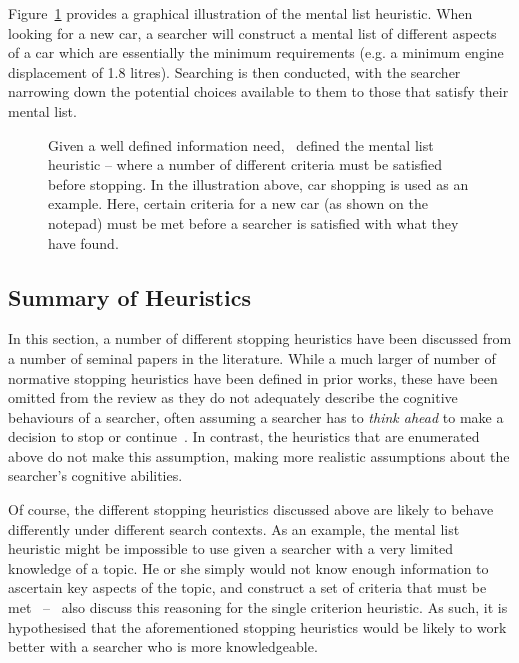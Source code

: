 Figure~\ref{fig:mental_list} provides a graphical illustration of the mental list heuristic. When looking for a new car, a searcher will construct a mental list of different aspects of a car which are essentially the minimum requirements (e.g. a minimum engine displacement of 1.8 litres). Searching is then conducted, with the searcher narrowing down the potential choices available to them to those that satisfy their mental list.

\begin{figure}[t!]
    \centering
    \caption[The mental list stopping heuristic]{Given a well defined information need,~\cite{nickles1995judgment} defined the mental list heuristic – where a number of different criteria must be satisfied before stopping. In the illustration above, car shopping is used as an example. Here, certain criteria for a new car (as shown on the notepad) must be met before a searcher is satisfied with what they have found.}
    \label{fig:mental_list}
\end{figure}

\subsection{Summary of Heuristics}
In this section, a number of different stopping heuristics have been discussed from a number of seminal papers in the literature. While a much larger of number of normative stopping heuristics have been defined in prior works, these have been omitted from the review as they do not adequately describe the cognitive behaviours of a searcher, often assuming a searcher has to \emph{think ahead} to make a decision to stop or continue~\citep{browne2004stopping_rules}. In contrast, the heuristics that are enumerated above do not make this assumption, making more realistic assumptions about the searcher's cognitive abilities.

Of course, the different stopping heuristics discussed above are likely to behave differently under different search contexts. As an example, the mental list heuristic might be impossible to use given a searcher with a very limited knowledge of a topic. He or she simply would not know enough information to ascertain key aspects of the topic, and construct a set of criteria that must be met~\citep{browne2005stopping_rules} --~\cite{gigerenzer1999betting} also discuss this reasoning for the single criterion heuristic. As such, it is hypothesised that the aforementioned stopping heuristics would be likely to work better with a searcher who is more knowledgeable.

